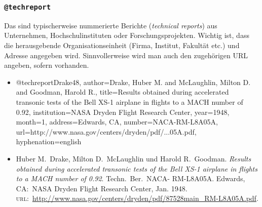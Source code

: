 \subsubsection{\texttt{@techreport}}
\label{sec:@techreport}
Das sind typischerweise nummerierte Berichte (\emph{technical reports}) aus Unternehmen, 
Hochschulinstituten oder Forschungsprojekten.
Wichtig ist, dass die herausgebende Organisationseinheit (Firma, Institut, Fakultät etc.) und 
Adresse angegeben wird. Sinnvollerweise wird man auch den zugehörigen URL angeben, sofern vorhanden. 
%
\begin{itemize}
\item[]
\begin{GenericCode}[numbers=none]
@techreport{Drake48,
  author={Drake, Huber M. and McLaughlin, Milton D. and Goodman, Harold R.},
  title={Results obtained during accelerated transonic tests of the {Bell} {XS-1} airplane in flights to a {MACH} number of 0.92},
  institution={NASA Dryden Flight Research Center},
  year={1948},
  month={1},
  address={Edwards, CA},
  number={NACA-RM-L8A05A},
  url={http://www.nasa.gov/centers/dryden/pdf/...05A.pdf},
  hyphenation={english}
}
\end{GenericCode}
\item[\cite{Drake48}]
Huber M.\ Drake, Milton D.\ McLaughlin und Harold R.\ Goodman.
\textit{Results obtained during accelerated transonic tests of the Bell XS-1
airplane in flights to a MACH number of 0.92}. Techn.\ Ber.\ NACA-
RM-L8A05A. Edwards, CA:\ NASA Dryden Flight Research Center,
Jan. 1948. \textsc{url}:\ \url{http://www.nasa.gov/centers/dryden/pdf/87528main_RM-L8A05A.pdf}.
\end{itemize}


